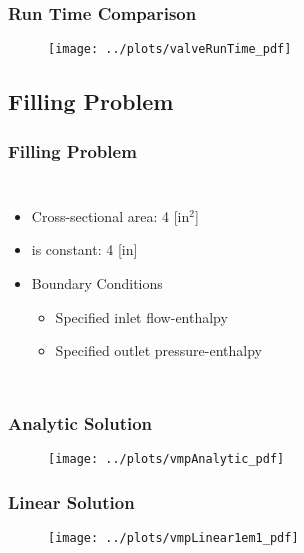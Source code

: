 \documentclass[compress,xcolor=table]{beamer}
\begin{document}
\begin{frame}
\frametitle{Run Time Comparison}

\begin{figure}[h!t]
\centering
\texttt{[image: ../plots/valveRunTime\_pdf]}
\end{figure}

\end{frame}
\subsection[Filling Problem]{Filling Problem}
\begin{frame}
\frametitle{Filling Problem}
\begin{columns}

\begin{itemize}
\item{Cross-sectional area: 4 [in$^2$]}
\item{\dx{} is constant: 4 [in]}
\item{ Boundary Conditions
	\begin{itemize}
	\item{Specified inlet flow-enthalpy}
	\item{Specified outlet pressure-enthalpy}
\end{itemize}
}
\end{itemize}

\begin{figure}[h!t]
\centering
\resizebox{\textwidth}{0.6\textheight}{

}

\end{figure}
\end{columns}
\end{frame}
\begin{frame}
\frametitle{Analytic Solution}

\begin{figure}[h!t]
\centering
\texttt{[image: ../plots/vmpAnalytic\_pdf]}
\end{figure}

\end{frame}
\begin{frame}
\frametitle{Linear Solution}

\begin{figure}[h!t]
\centering
\texttt{[image: ../plots/vmpLinear1em1\_pdf]}
\end{figure}

\end{frame}
\end{document}
